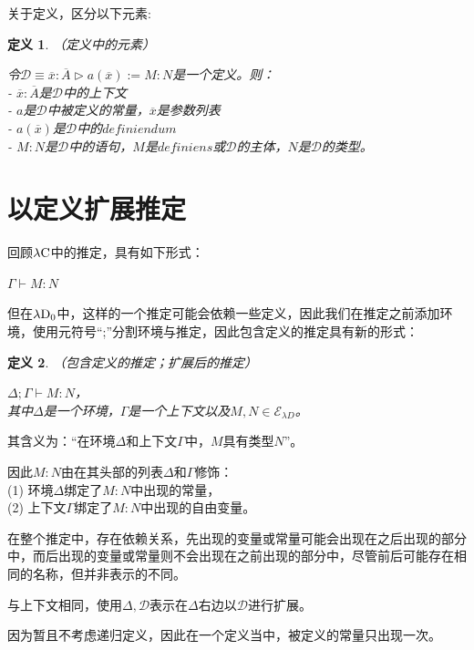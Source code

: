 \documentclass[UTF8]{article}
\newtheorem{thm}{定义}[section]
\begin{document}
		关于定义，区分以下元素:
		
		\begin{thm}（定义中的元素）
			
			\noindent
			令$\mathcal{D}\equiv\overline{x}:\overline{A}\triangleright a(\overline{x}):=M:N$是一个定义。则：\\
			- $\overline{x}:\overline{A}$是$\mathcal{D}$中的上下文\\
			- $a$是$\mathcal{D}$中被定义的常量，$\overline{x}$是参数列表\\
			- $a(\overline{x})$是$\mathcal{D}$中的$definiendum$\\
			- $M:N$是$\mathcal{D}$中的语句，$M$是$definiens$或$\mathcal{D}$的主体，$N$是$\mathcal{D}$的类型。
		\end{thm}

	\section{以定义扩展推定}
	\noindent
	回顾$\lambda{\rm C}$中的推定，具有如下形式：
	
		$\Gamma\vdash M:N$
		
		但在$\lambda{\rm D_0}$中，这样的一个推定可能会依赖一些定义，因此我们在推定之前添加环境，使用元符号“;”分割环境与推定，因此包含定义的推定具有新的形式：
		
		\begin{thm}（包含定义的推定；扩展后的推定）
			
			$\Delta;\Gamma\vdash M:N$，\\
			其中$\Delta$是一个环境，$\Gamma$是一个上下文以及$M,N\in\mathcal{E}_{\lambda{D}}$。
		\end{thm}
	
		其含义为：“在环境$\Delta$和上下文$\Gamma$中，$M$具有类型$N$”。
		
		因此$M:N$由在其头部的列表$\Delta$和$\Gamma$修饰：\\
		(1) 环境$\Delta$绑定了$M:N$中出现的常量，\\
		(2) 上下文$\Gamma$绑定了$M:N$中出现的自由变量。
		
		在整个推定中，存在依赖关系，先出现的变量或常量可能会出现在之后出现的部分中，而后出现的变量或常量则不会出现在之前出现的部分中，尽管前后可能存在相同的名称，但并非表示的不同。
		
		与上下文相同，使用$\Delta,\mathcal{D}$表示在$\Delta$右边以$\mathcal{D}$进行扩展。
		
		因为暂且不考虑递归定义，因此在一个定义当中，被定义的常量只出现一次。
		
\end{document}

